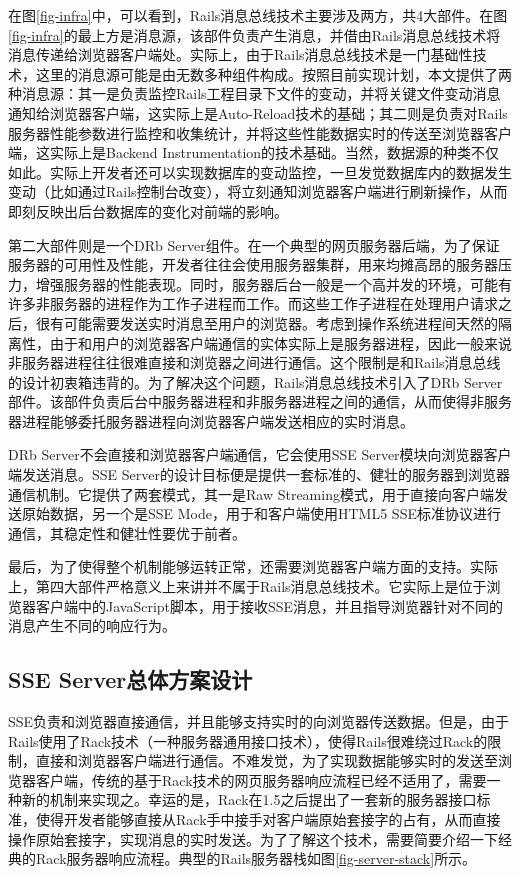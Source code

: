 在图\ref{fig-infra}中，可以看到，Rails消息总线技术主要涉及两方，共4大部件。在图\ref{fig-infra}的最上方是消息源，该部件负责产生消息，并借由Rails消息总线技术将 消息传递给浏览器客户端处。实际上，由于Rails消息总线技术是一门基础性技术，这里的消息源可能是由无数多种组件构成。按照目前实现计划，本文提供了两种消息源：其一是负责监控Rails工程目录下文件的变动，并将关键文件变动消息通知给浏览器客户端，这实际上是Auto-Reload技术的基础；其二则是负责对Rails服务器性能参数进行监控和收集统计，并将这些性能数据实时的传送至浏览器客户端，这实际上是Backend Instrumentation的技术基础。当然，数据源的种类不仅如此。实际上开发者还可以实现数据库的变动监控，一旦发觉数据库内的数据发生变动（比如通过Rails控制台改变），将立刻通知浏览器客户端进行刷新操作，从而即刻反映出后台数据库的变化对前端的影响。

第二大部件则是一个DRb Server组件。在一个典型的网页服务器后端，为了保证服务器的可用性及性能，开发者往往会使用服务器集群，用来均摊高昂的服务器压力，增强服务器的性能表现。同时，服务器后台一般是一个高并发的环境，可能有许多非服务器的进程作为工作子进程而工作。而这些工作子进程在处理用户请求之后，很有可能需要发送实时消息至用户的浏览器。考虑到操作系统进程间天然的隔离性，由于和用户的浏览器客户端通信的实体实际上是服务器进程，因此一般来说非服务器进程往往很难直接和浏览器之间进行通信。这个限制是和Rails消息总线的设计初衷箱违背的。为了解决这个问题，Rails消息总线技术引入了DRb Server部件。该部件负责后台中服务器进程和非服务器进程之间的通信，从而使得非服务器进程能够委托服务器进程向浏览器客户端发送相应的实时消息。

DRb Server不会直接和浏览器客户端通信，它会使用SSE Server模块向浏览器客户端发送消息。SSE Server的设计目标便是提供一套标准的、健壮的服务器到浏览器通信机制。它提供了两套模式，其一是Raw Streaming模式，用于直接向客户端发送原始数据，另一个是SSE Mode，用于和客户端使用HTML5 SSE标准协议进行通信，其稳定性和健壮性要优于前者。

最后，为了使得整个机制能够运转正常，还需要浏览器客户端方面的支持。实际上，第四大部件严格意义上来讲并不属于Rails消息总线技术。它实际上是位于浏览器客户端中的JavaScript脚本，用于接收SSE消息，并且指导浏览器针对不同的消息产生不同的响应行为。

\subsection{SSE Server总体方案设计}
SSE负责和浏览器直接通信，并且能够支持实时的向浏览器传送数据。但是，由于Rails使用了Rack技术（一种服务器通用接口技术），使得Rails很难绕过Rack的限制，直接和浏览器客户端进行通信。不难发觉，为了实现数据能够实时的发送至浏览器客户端，传统的基于Rack技术的网页服务器响应流程已经不适用了，需要一种新的机制来实现之。幸运的是，Rack在1.5之后提出了一套新的服务器接口标准，使得开发者能够直接从Rack手中接手对客户端原始套接字的占有，从而直接操作原始套接字，实现消息的实时发送。为了了解这个技术，需要简要介绍一下经典的Rack服务器响应流程。典型的Rails服务器栈如图\ref{fig-server-stack}所示。

